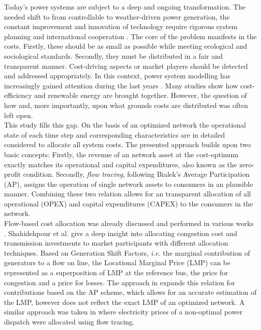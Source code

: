 \documentclass[11pt,twocolumn]{article}
\newcommand{\ie}{\textit{i.e.} }
\begin{document}
Today's power systems are subject to a deep and ongoing transformation. The needed shift to from controllable to weather-driven power generation, the constant improvement and innovation of technology require rigorous system planning and international cooperation \cite{pfenninger_energy_2014,schlachtberger_benefits_2017}. The core of the problem manifests in the costs. Firstly, these should be as small as possible while meeting ecological and sociological standards. Secondly, they must be distributed in a fair and transparent manner. Cost-driving aspects or market players should be detected and addressed appropriately. 
In this context, power system modelling has increasingly gained attention during the last years \cite{bazmi_sustainable_2011,pfenninger_energy_2014,pereira_generation_2017}. Many studies show how cost-efficiency and renewable energy are brought together. However, the question of how and, more importantly, upon what grounds costs are distributed was often left open. \\
This study fills this gap. On the basis of an optimized network the operational state of each time step and corresponding characteristics are in detailed considered to allocate all system costs. The presented approach builds upon two basic concepts: Firstly, the revenue of an network asset at the cost-optimum exactly matches its operational and capital expenditures, also known as the zero-profit condition. Secondly, \textit{flow tracing}, following Bialek's Average Participation (AP), assigns the operation of single network assets to consumers in an plausible manner. 
Combining these two relation allows for an transparent allocation of all operational (OPEX) and capital expenditures (CAPEX) to the consumers in the network. \\
Flow-based cost allocation was already discussed and performed in various works \cite{galiana_transmission_2003,shahidehpour_market_2002,meng_investigation_2007,tranberg_flow-based_2018,nikoukar_transmission_2012,arabali_pricing_2012,wu_locational_2005}. Shahidehpour et al. give a deep insight into allocating congestion cost and transmission investments to market participants \cite{shahidehpour_market_2002} with different allocation techniques. Based on Generation Shift Factors, \ie the marginal contribution of generators to a flow on line, the Locational Marginal Price (LMP) can be represented as a superposition of LMP at the reference bus, the price for congestion and a price for losses. The approach in \cite{meng_investigation_2007} expands this relation for contributions based on the AP scheme, which allows for an accurate estimation of the LMP, however does not reflect the exact LMP of an optimized network. A similar approach was taken in \cite{tranberg_flow-based_2018} where electricity prices of a non-optimal power dispatch were allocated using flow tracing. 
\end{document}
